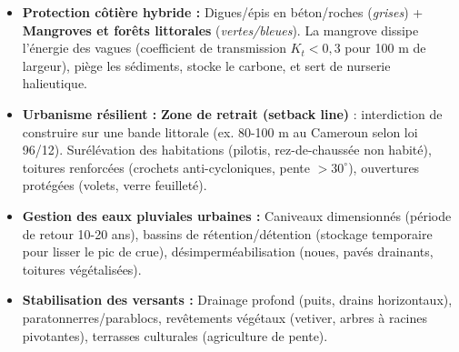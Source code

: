 \documentclass[11pt]{article}
\begin{document}
\begin{propriete}
\begin{itemize}
    \item \textbf{Protection côtière hybride :} Digues/épis en béton/roches (\emph{grises}) + \textbf{Mangroves et forêts littorales} (\emph{vertes/bleues}). La mangrove dissipe l'énergie des vagues (coefficient de transmission $K_t < 0,3$ pour 100 m de largeur), piège les sédiments, stocke le carbone, et sert de nurserie halieutique.
    \item \textbf{Urbanisme résilient :} \textbf{Zone de retrait (setback line)} : interdiction de construire sur une bande littorale (ex. 80-100 m au Cameroun selon loi 96/12). Surélévation des habitations (pilotis, rez-de-chaussée non habité), toitures renforcées (crochets anti-cycloniques, pente $> 30^\circ$), ouvertures protégées (volets, verre feuilleté).
    \item \textbf{Gestion des eaux pluviales urbaines :} Caniveaux dimensionnés (période de retour 10-20 ans), bassins de rétention/détention (stockage temporaire pour lisser le pic de crue), désimperméabilisation (noues, pavés drainants, toitures végétalisées).
    \item \textbf{Stabilisation des versants :} Drainage profond (puits, drains horizontaux), paratonnerres/parablocs, revêtements végétaux (vetiver, arbres à racines pivotantes), terrasses culturales (agriculture de pente).
\end{itemize}
\end{propriete}
\end{document}
